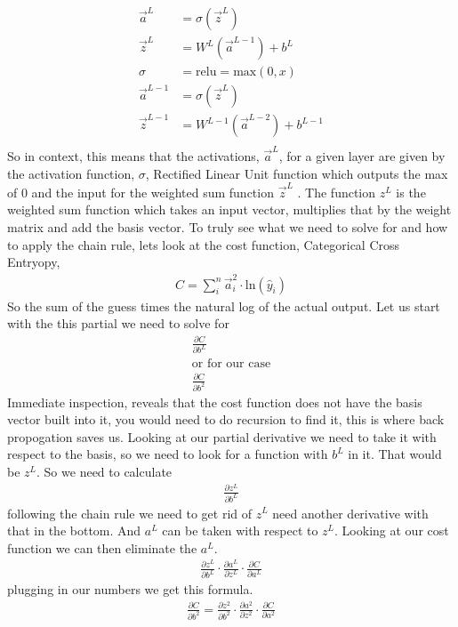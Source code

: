 \documentclass[]{article}
\newcommand{\pderiv}[2]{\frac{\partial #1}{\partial #2}}
\begin{document}
\begin{align*}
    \vec{a}^L &= \sigma\left(\vec{z}^L\right)\\
    \vec{z}^L &= W^L\left(\vec{a}^{L-1}\right) + b^L\\
    \sigma &= \text{relu} = \text{max}(0,x)\\
    \vec{a}^{L-1} &= \sigma\left(\vec{z}^L\right)\\
    \vec{z}^{L-1} &= W^{L-1}\left(\vec{a}^{L-2}\right) + b^{L-1}\\
\end{align*}
So in context, this means that the activations, $\vec{a}^L$, for a given layer are given by the activation function, $\sigma$, Rectified Linear Unit function which outputs the max of 0 and the input for the weighted sum function $\vec{z}^L$ . The function $z^L$ is the weighted sum function which takes an input vector, multiplies that by the weight matrix and add the basis vector. To truly see what we need to solve for and how to apply the chain rule, lets look at the cost function, Categorical Cross Entryopy,
\begin{align}
    C = \sum_{i}^{n}\vec{a}^2_i\cdot\text{ln}(\hat{y}_i)
\end{align}
So the sum of the guess times the natural log of the actual output. Let us start with the this partial we need to solve for
\begin{align}
    \frac{\partial{C}}{\partial{b^L}}\\
    \text{or for our case}\\
    \frac{\partial{C}}{\partial{b^2}}
\end{align}
Immediate inspection, reveals that the cost function does not have the basis vector built into it, you would need to do recursion to find it, this is where back propogation saves us. Looking at our partial derivative we need to take it with respect to the basis, so we need to look for a function with $b^L$ in it. That would be $z^L$. So we need to calculate
\begin{align}
    \frac{\partial{z^L}}{\partial{b^L}}
\end{align}
following the chain rule we need to get rid of $z^L$ need another derivative with that in the bottom. And $a^L$ can be taken with respect to $z^L$. Looking at our cost function we can then eliminate the $a^L$.
\begin{align}
    \pderiv{z^L}{b^L} \cdot \pderiv{a^L}{z^L} \cdot \pderiv{C}{a^L}
\end{align}
plugging in our numbers we get this formula.
\begin{align}
    \pderiv{C}{b^2}=\pderiv{z^2}{b^2} \cdot \pderiv{a^2}{z^2} \cdot \pderiv{C}{a^2}
\end{align}
\end{document}
